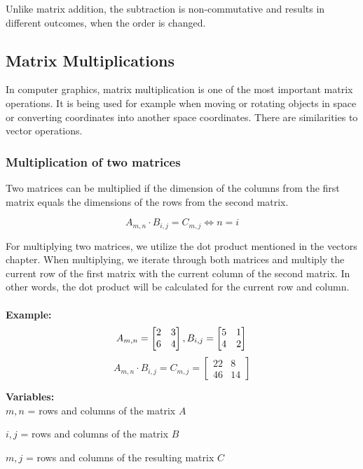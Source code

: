 Unlike matrix addition, the subtraction is non-commutative and results in different outcomes, when the order is changed.

\subsection{Matrix Multiplications}
In computer graphics, matrix multiplication is one of the most important matrix operations. It is being used for example when moving or rotating objects in space or converting coordinates into another space coordinates. There are similarities to vector operations.

\subsubsection{Multiplication of two matrices}
Two matrices can be multiplied if the dimension of the columns from the first matrix equals the dimensions of the rows from the second matrix. 

\[A_{m,n} \cdot B_{i,j} = C_{m,j} \Longleftrightarrow n = i\]


For multiplying two matrices, we utilize the dot product mentioned in the vectors chapter. When multiplying, we iterate through both matrices and multiply the current row of the first matrix with the current column of the second matrix. In other words, the dot product will be calculated for the current row and column. \\
\\
\textbf{Example:} \\
\[
A_{m,n} = 
\begin{bmatrix}
2 & 3 \\
6 & 4
\end{bmatrix}
,
B_{i,j} = 
\begin{bmatrix}
5 & 1 \\
4 & 2
\end{bmatrix}
\\ 
\]
\[
A_{m,n} \cdot B_{i,j} = C_{m,j} =
\begin{bmatrix}
22 & 8 \\
46 & 14
\end{bmatrix}
\]

\textbf{Variables: } \\
$m,n$ = rows and columns of the matrix $A$

$i,j$ = rows and columns of the matrix $B$

$m,j$ = rows and columns of the resulting matrix $C$ \\

